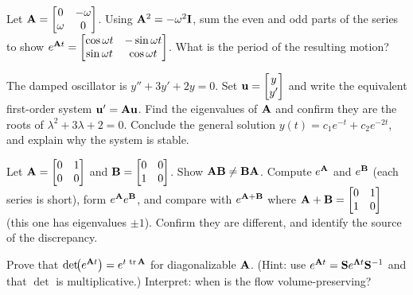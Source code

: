 \begin{exercise}
\label{ch25:ex-rotation}
Let $\mathbf{A}=\begin{bmatrix}0&-\omega\\\omega&0\end{bmatrix}$. Using
$\mathbf{A}^2=-\omega^2\mathbf{I}$, sum the even and odd parts of the series to show
$e^{\mathbf{A}t}=\begin{bmatrix}\cos\omega t&-\sin\omega t\\\sin\omega t&\cos\omega t
\end{bmatrix}$. What is the period of the resulting motion?
\end{exercise}

\begin{exercise}
\label{ch25:ex-secondorder}
The damped oscillator is $y''+3y'+2y=0$. Set $\mathbf{u}=\begin{bmatrix}y\\y'\end{bmatrix}$ and write
the equivalent first-order system $\mathbf{u}'=\mathbf{A}\mathbf{u}$. Find the eigenvalues
of $\mathbf{A}$ and confirm they are the roots of $\lambda^2+3\lambda+2=0$. Conclude
the general solution $y(t)=c_1 e^{-t}+c_2 e^{-2t}$, and explain why the system is
stable.
\end{exercise}

\begin{exercise}
\label{ch25:ex-commutator}
Let $\mathbf{A}=\begin{bmatrix}0&1\\0&0\end{bmatrix}$ and
$\mathbf{B}=\begin{bmatrix}0&0\\1&0\end{bmatrix}$. Show $\mathbf{A}\mathbf{B}\neq
\mathbf{B}\mathbf{A}$. Compute $e^{\mathbf{A}}$ and $e^{\mathbf{B}}$ (each series is short),
form $e^{\mathbf{A}}e^{\mathbf{B}}$, and compare with $e^{\mathbf{A}+\mathbf{B}}$ where
$\mathbf{A}+\mathbf{B}=\begin{bmatrix}0&1\\1&0\end{bmatrix}$ (this one has eigenvalues
$\pm1$). Confirm they are different, and identify the source of the discrepancy.
\end{exercise}

\begin{exercise}
\label{ch25:ex-trace}
Prove that $\det\!\bigl(e^{\mathbf{A}t}\bigr)=e^{t\,\operatorname{tr}\mathbf{A}}$ for diagonalizable
$\mathbf{A}$. (Hint: use $e^{\mathbf{A}t}=\mathbf{S}e^{\mathbf{\Lambda}t}\mathbf{S}^{-1}$ and that
$\det$ is multiplicative.) Interpret: when is the flow volume-preserving?
\end{exercise}

